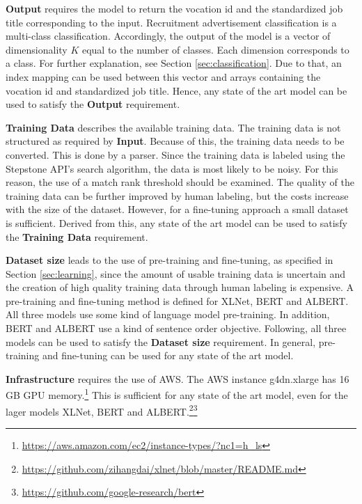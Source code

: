 \par
\textbf{Output} requires the model to return the vocation id and the standardized job title corresponding to the input. Recruitment advertisement classification is a multi-class classification. Accordingly, the output of the model is a vector of dimensionality $K$ equal to the number of classes. Each dimension corresponds to a class.\autocites{Devlin.2018}{Yang.2019}{Lan.2019} For further explanation, see Section \ref{sec:classification}.  Due to that, an index mapping can be used between this vector and arrays containing the vocation id and standardized job title. Hence, any state of the art model can be used to satisfy the \textbf{Output} requirement.
\par
\textbf{Training Data} describes the available training data. The training data is not structured as required by \textbf{Input}. Because of this, the training data needs to be converted. This is done by a parser. Since the training data is labeled using the Stepstone \ac{API}'s search algorithm, the data is most likely to be noisy. For this reason, the use of a match rank threshold should be examined. The quality of the training data can be further improved by human labeling, but the costs increase with the size of the dataset. However, for a fine-tuning approach a small dataset is sufficient. Derived from this, any state of the art model can be used to satisfy the \textbf{Training Data} requirement.
\par
\textbf{Dataset size} leads to the use of pre-training and fine-tuning, as specified in Section \ref{sec:learning}, since the amount of usable training data is uncertain and the creation of high quality training data through human labeling is expensive. A pre-training and fine-tuning method is defined for XLNet, BERT and ALBERT. All three models use some kind of language model pre-training. In addition, BERT and ALBERT use a kind of sentence order objective.\autocites{Devlin.2018}{Yang.2019}{Lan.2019} Following, all three models can be used to satisfy the \textbf{Dataset size} requirement. In general, pre-training and fine-tuning can be used for any state of the art model.
\par
\textbf{Infrastructure} requires the use of \ac{AWS}. The \ac{AWS} instance g4dn.xlarge has 16 GB GPU memory.\footnote{\url{https://aws.amazon.com/ec2/instance-types/?nc1=h_ls}} This is sufficient for any state of the art model, even for the lager models XLNet, BERT and ALBERT.\footnote{\url{https://github.com/zihangdai/xlnet/blob/master/README.md}}\footnote{\url{https://github.com/google-research/bert}}\autocite{Lan.2019}
